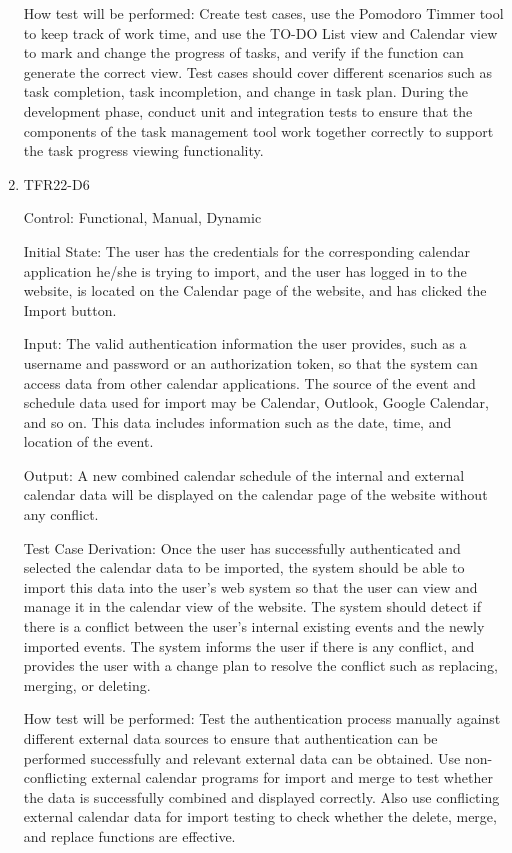 \documentclass[12pt, titlepage]{article}
\begin{document}
\begin{enumerate}
How test will be performed: Create test cases, use the Pomodoro Timmer tool to keep track of work time, and use the TO-DO List view and Calendar view to mark and change the progress of tasks, and verify if the function can generate the correct view. Test cases should cover different scenarios such as task completion, task incompletion, and change in task plan. During the development phase, conduct unit and integration tests to ensure that the components of the task management tool work together correctly to support the task progress viewing functionality.

\item{TFR22-D6\\} \label{TFR22-D6}

Control: Functional, Manual, Dynamic
					
Initial State: The user has the credentials for the corresponding calendar application he/she is trying to import, and the user has logged in to the website, is located on the Calendar page of the website, and has clicked the Import button.
					
Input: The valid authentication information the user provides, such as a username and password or an authorization token, so that the system can access data from other calendar applications. The source of the event and schedule data used for import may be Calendar, Outlook, Google Calendar, and so on. This data includes information such as the date, time, and location of the event. 
					
Output: A new combined calendar schedule of the internal and external calendar data will be displayed on the calendar page of the website without any conflict. 

Test Case Derivation: Once the user has successfully authenticated and selected the calendar data to be imported, the system should be able to import this data into the user's web system so that the user can view and manage it in the calendar view of the website. The system should detect if there is a conflict between the user's internal existing events and the newly imported events. The system informs the user if there is any conflict, and provides the user with a change plan to resolve the conflict such as replacing, merging, or deleting.

How test will be performed: Test the authentication process manually against different external data sources to ensure that authentication can be performed successfully and relevant external data can be obtained. Use non-conflicting external calendar programs for import and merge to test whether the data is successfully combined and displayed correctly. Also use conflicting external calendar data for import testing to check whether the delete, merge, and replace functions are effective.


\end{enumerate}
\end{document}
